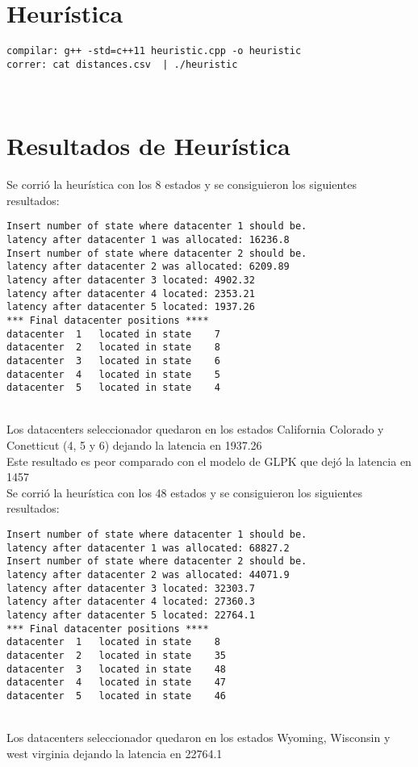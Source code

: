 \documentclass{article}
\begin{document}
\part{Heur\'istica}
\begin{verbatim}
compilar: g++ -std=c++11 heuristic.cpp -o heuristic
correr: cat distances.csv  | ./heuristic
\end{verbatim}

\






\newpage
\part{Resultados de Heur\'istica}

Se corri\'o la heur\'istica con los 8 estados y se consiguieron los siguientes resultados:
\begin{verbatim}
Insert number of state where datacenter 1 should be.
latency after datacenter 1 was allocated: 16236.8
Insert number of state where datacenter 2 should be.
latency after datacenter 2 was allocated: 6209.89
latency after datacenter 3 located: 4902.32
latency after datacenter 4 located: 2353.21
latency after datacenter 5 located: 1937.26
*** Final datacenter positions ****
datacenter	1	located in state	7
datacenter	2	located in state	8
datacenter	3	located in state	6
datacenter	4	located in state	5
datacenter	5	located in state	4
\end{verbatim}

\smallskip\\
Los datacenters seleccionador quedaron en los estados California Colorado y Conetticut (4, 5 y 6) dejando la latencia en 1937.26
\smallskip\\
Este resultado es peor comparado con el modelo de GLPK que dej\'o la latencia en 1457
\bigskip\\


Se corri\'o la heur\'istica con los 48 estados y se consiguieron los siguientes resultados:
\begin{verbatim}
Insert number of state where datacenter 1 should be.
latency after datacenter 1 was allocated: 68827.2
Insert number of state where datacenter 2 should be.
latency after datacenter 2 was allocated: 44071.9
latency after datacenter 3 located: 32303.7
latency after datacenter 4 located: 27360.3
latency after datacenter 5 located: 22764.1
*** Final datacenter positions ****
datacenter	1	located in state	8
datacenter	2	located in state	35
datacenter	3	located in state	48
datacenter	4	located in state	47
datacenter	5	located in state	46

\end{verbatim}
\smallskip\\
Los datacenters seleccionador quedaron en los estados Wyoming, Wisconsin y west virginia dejando la latencia en 22764.1
\end{document}
